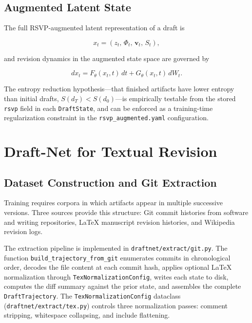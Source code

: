\documentclass[12pt,a4paper]{article}
\theoremstyle{draftthm}
\newcommand{\Ftheta}{F_{\theta}}
\newcommand{\Gtheta}{G_{\theta}}
\newcommand{\bW}{W}
\newcommand{\code}[1]{\texttt{\small #1}}
\begin{document}
\subsection{Augmented Latent State}

The full RSVP-augmented latent representation of a draft is

\begin{equation}
  x_t = (z_t,\, \Phi_t,\, \mathbf{v}_t,\, S_t),
  \label{eq:augmented-state}
\end{equation}

and revision dynamics in the augmented state space are governed by

\begin{equation}
  dx_t = \Ftheta(x_t, t)\, dt + \Gtheta(x_t, t)\, d\bW_t.
  \label{eq:augmented-sde}
\end{equation}

The entropy reduction hypothesis---that finished artifacts have lower entropy than initial drafts, $S(d_T) < S(d_0)$---is empirically testable from the stored \code{rsvp} field in each \code{DraftState}, and can be enforced as a training-time regularization constraint in the \code{rsvp\_augmented.yaml} configuration.

\section{Draft-Net for Textual Revision}

\subsection{Dataset Construction and Git Extraction}

Training requires corpora in which artifacts appear in multiple successive versions. Three sources provide this structure: Git commit histories from software and writing repositories, \LaTeX{} manuscript revision histories, and Wikipedia revision logs.

The extraction pipeline is implemented in \code{draftnet/extract/git.py}. The function \code{build\_trajectory\_from\_git} enumerates commits in chronological order, decodes the file content at each commit hash, applies optional \LaTeX{} normalization through \code{TexNormalizationConfig}, writes each state to disk, computes the diff summary against the prior state, and assembles the complete \code{DraftTrajectory}. The \code{TexNormalizationConfig} dataclass (\code{draftnet/extract/tex.py}) controls three normalization passes: comment stripping, whitespace collapsing, and include flattening.
\end{document}

